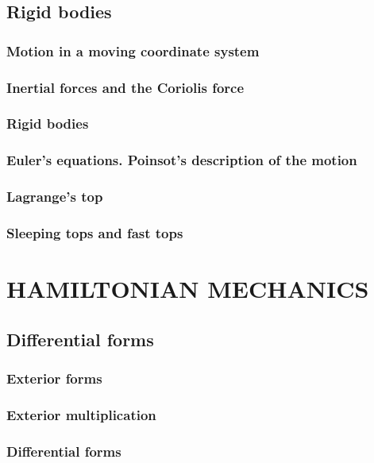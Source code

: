 \documentclass{book}
\numberwithin{equation}{section}
\theoremstyle{plain}
\theoremstyle{definition}
\theoremstyle{remark}
\theoremstyle{remark}
\begin{document}
\chapter{Rigid bodies}

\section{Motion in a moving coordinate system}

\section{Inertial forces and the Coriolis force}

\section{Rigid bodies}

\section{Euler's equations. Poinsot's description of the motion}

\section{Lagrange's top}

\section{Sleeping tops and fast tops}

\part{HAMILTONIAN MECHANICS}

\chapter{Differential forms}

\section{Exterior forms}

\section{Exterior multiplication}

\section{Differential forms}
\end{document}

